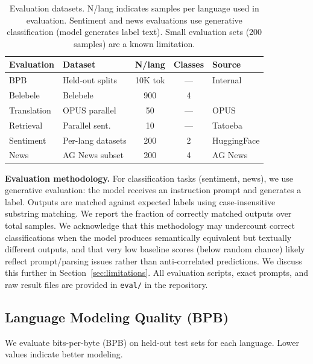 \documentclass[10pt,twocolumn]{article}
\begin{document}
\begin{table}[H]
\centering\scriptsize
\begin{tabular}{llccl}
\toprule
\textbf{Evaluation} & \textbf{Dataset} & \textbf{N/lang} & \textbf{Classes} & \textbf{Source} \\
\midrule
BPB & Held-out splits & 10K tok & --- & Internal \\
Belebele & Belebele & 900 & 4 & \citet{bandarkar2023belebele} \\
Translation & OPUS parallel & 50 & --- & OPUS \\
Retrieval & Parallel sent. & 10 & --- & Tatoeba \\
Sentiment & Per-lang datasets & 200 & 2 & HuggingFace \\
News & AG News subset & 200 & 4 & AG News \\
\bottomrule
\end{tabular}
\caption{Evaluation datasets. N/lang indicates samples per language used in evaluation. Sentiment and news evaluations use generative classification (model generates label text). Small evaluation sets (200 samples) are a known limitation.}
\label{tab:datasets}
\end{table}

\textbf{Evaluation methodology.} For classification tasks (sentiment, news), we use generative evaluation: the model receives an instruction prompt and generates a label. Outputs are matched against expected labels using case-insensitive substring matching. We report the fraction of correctly matched outputs over total samples. We acknowledge that this methodology may undercount correct classifications when the model produces semantically equivalent but textually different outputs, and that very low baseline scores (below random chance) likely reflect prompt/parsing issues rather than anti-correlated predictions. We discuss this further in Section~\ref{sec:limitations}. All evaluation scripts, exact prompts, and raw result files are provided in \texttt{eval/} in the repository.

\subsection{Language Modeling Quality (BPB)}

We evaluate bits-per-byte (BPB) on held-out test sets for each language. Lower values indicate better modeling.
\end{document}
